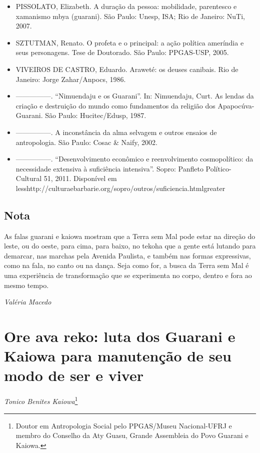 \begin{itemize}
\item PISSOLATO, Elizabeth. A duração da pessoa: mobilidade, parentesco
e xamanismo mbya (guarani). São Paulo: Unesp, ISA; Rio de Janeiro:
NuTi, 2007.

\item SZTUTMAN, Renato. O profeta e o principal: a ação política
ameríndia e seus personagens. Tese de Doutorado. São Paulo: PPGAS-USP,
2005.

\item VIVEIROS DE CASTRO, Eduardo. Araweté: os deuses canibais. Rio de
Janeiro: Jorge Zahar/Anpocs, 1986.

\item —————. ``Nimuendaju e os Guarani''. In: Nimuendaju, Curt. As lendas
da criação e destruição do mundo como fundamentos da religião dos
Apapocúva-Guarani. São Paulo: Hucitec/Edusp, 1987.

\item —————. A inconstância da alma selvagem e outros ensaios de
antropologia. São Paulo: Cosac \& Naify, 2002.

\item —————. ``Desenvolvimento econômico e reenvolvimento cosmopolítico:
da necessidade extensiva à suficiência intensiva''. Sopro: Panfleto
Político-Cultural 51, 2011. Disponível em
{less}http://culturaebarbarie.org/sopro/outros/suficiencia.html{greater}
\end{itemize}

\section{Nota}
As falas guarani e kaiowa mostram que a Terra sem Mal pode estar na
direção do leste, ou do oeste, para cima, para baixo, no tekoha que a
gente está lutando para demarcar, nas marchas pela Avenida Paulista, e
também nas formas expressivas, como na fala, no canto ou na dança. Seja
como for, a busca da Terra sem Mal é uma experiência de transformação
que se experimenta no corpo, dentro e fora ao mesmo tempo.
\medskip
\begin{flushright}
\emph{Valéria Macedo}
\end{flushright}

\chapter{Ore ava reko: luta dos Guarani e Kaiowa para
manutenção de seu modo de ser e viver}

\begin{flushright}
\emph{Tonico Benites Kaiowa}\footnote{Doutor em Antropologia Social pelo
PPGAS/Museu Nacional-UFRJ e membro do Conselho da Aty Guasu, Grande
Assembleia do Povo Guarani e Kaiowa.}
\end{flushright}
\bigskip

